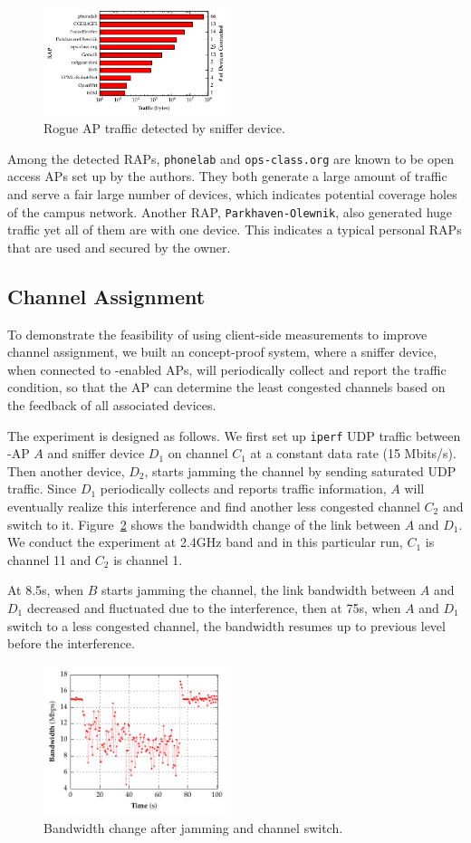 \begin{figure}[t!]
  \centering
  \includegraphics[width=0.48\textwidth]{./figures/RAPTrafficGraph.pdf}
  \caption{Rogue AP traffic detected by sniffer device.}
  \label{fig:rap}
\end{figure}

Among the detected RAPs, \texttt{phonelab} and \texttt{ops-class.org} are known
to be open access APs set up by the authors.  They both generate a large amount of
traffic and serve a fair large number of devices, which indicates potential coverage
holes of the campus network. Another RAP, \texttt{Parkhaven-Olewnik}, also
generated huge traffic yet all of them are with one device. This indicates a
typical personal RAPs that are used and secured by the owner.


\subsection{Channel Assignment}
To demonstrate the feasibility of using client-side measurements to improve
channel assignment, we built an concept-proof system, where a sniffer device,
when connected to \PS{}-enabled APs, will periodically collect
and report the traffic condition, so that the AP can determine the least
congested channels based on the feedback of all associated devices. 

The experiment is designed as follows. We first set up \texttt{iperf} UDP
traffic between \PS{}-AP $A$ and sniffer device $D_1$ on channel $C_1$ at a
constant data rate (15 Mbits/s). Then another device, $D_2$, starts jamming the
channel by sending saturated UDP traffic. Since $D_1$ periodically collects and
reports traffic information, $A$ will eventually realize this interference and
find another less congested channel $C_2$ and switch to it. Figure~\ref{fig:bw}
shows the bandwidth change of the link between $A$ and $D_1$. We conduct the
experiment at 2.4GHz band and in this particular run, $C_1$ is channel 11 and $C_2$
is channel 1.

At 8.5s, when $B$ starts jamming the channel, the link bandwidth between $A$ and
$D_1$ decreased and fluctuated due to the interference, then at 75s, when $A$
and $D_1$ switch to a less congested channel, the bandwidth resumes up to
previous level before the interference.

\begin{figure}[t!]
  \centering
  \includegraphics[width=0.48\textwidth]{./figures/ChannelBWGraph.pdf}
  \caption{Bandwidth change after jamming and channel switch.}
  \label{fig:bw}
\end{figure}
